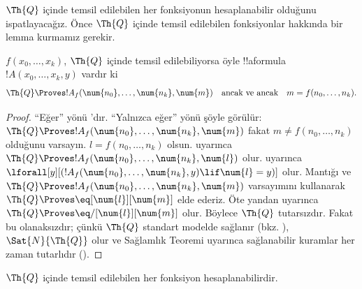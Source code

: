 \documentclass[../../../include/open-logic-section]{subfiles}
\begin{document}

$\Th{Q}$ içinde temsil edilebilen her fonksiyonun hesaplanabilir olduğunu
ispatlayacağız. Önce $\Th{Q}$ içinde temsil edilebilen fonksiyonlar hakkında
bir lemma kurmamız gerekir.

\begin{lem}
  $f(x_0, \dots, x_k)$, $\Th{Q}$ içinde temsil edilebiliyorsa öyle
  !!a{formula}~$!A(x_0, \dots, x_k, y)$ vardır ki
  \[
  \Th{Q} \Proves !A_f(\num{n_0}, \dots, \num{n_k}, \num{m})
  \quad\text{ancak ve ancak}\quad m = f(n_0, \dots, n_k).
  \]
\end{lem}

\begin{proof}
  ``Eğer'' yönü
'dır. ``Yalnızca
eğer'' yönü şöyle görülür: $\Th{Q} \Proves !A_f(\num{n_0},
\dots, \num{n_k}, \num{m})$ fakat $m \neq f(n_0, \dots, n_k)$ olduğunu
varsayın. $l=f(n_0,\dots,n_k)$ olsun.
 uyarınca
$\Th{Q} \Proves !A_f(\num{n_0}, \dots, \num{n_k}, \num{l})$ olur.
 uyarınca
$\lforall[y][(!A_f(\num{n_0}, \dots, \num{n_k}, y) \lif \num{l} =
y)]$ olur. Mantığı ve $\Th{Q} \Proves
!A_f(\num{n_0}, \dots, \num{n_k}, \num{m})$ varsayımını kullanarak
$\Th{Q} \Proves \eq[\num{l}][\num{m}]$ elde ederiz. Öte yandan
 uyarınca $\Th{Q} \Proves
\eq/[\num{l}][\num{m}]$ olur. Böylece $\Th{Q}$ tutarsızdır. Fakat bu
olanaksızdır; çünkü $\Th{Q}$ standart modelde sağlanır (bkz.
), $\Sat{N}{\Th{Q}}$ olur ve
Sağlamlık Teoremi uyarınca sağlanabilir kuramlar her zaman tutarlıdır
().
\end{proof}

\begin{lem}
$\Th{Q}$ içinde temsil edilebilen her fonksiyon hesaplanabilirdir.
\end{lem}
\end{document}
